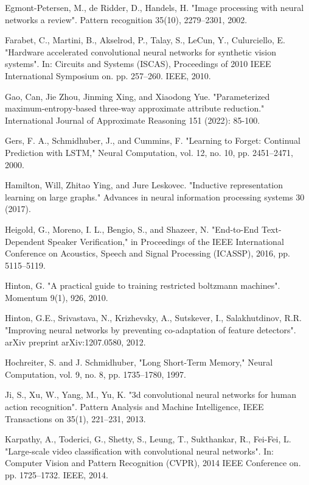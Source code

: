 \documentclass{article}
\begin{document}
\begin{thebibliography}{99}
 Egmont-Petersen, M., de Ridder, D., Handels, H. "Image processing with neural networks a review". Pattern recognition 35(10), 2279–2301, 2002.

 Farabet, C., Martini, B., Akselrod, P., Talay, S., LeCun, Y., Culurciello, E. "Hardware accelerated convolutional neural networks for synthetic vision systems". In: Circuits and Systems (ISCAS), Proceedings of 2010 IEEE International Symposium on. pp. 257–260. IEEE, 2010.

 Gao, Can, Jie Zhou, Jinming Xing, and Xiaodong Yue. "Parameterized maximum-entropy-based three-way approximate attribute reduction." International Journal of Approximate Reasoning 151 (2022): 85-100.

 Gers, F. A., Schmidhuber, J., and Cummins, F. "Learning to Forget: Continual Prediction with LSTM," Neural Computation, vol. 12, no. 10, pp. 2451–2471, 2000.

 Hamilton, Will, Zhitao Ying, and Jure Leskovec. "Inductive representation learning on large graphs." Advances in neural information processing systems 30 (2017).

 Heigold, G., Moreno, I. L., Bengio, S., and Shazeer, N. "End-to-End Text-Dependent Speaker Verification," in Proceedings of the IEEE International Conference on Acoustics, Speech and Signal Processing (ICASSP), 2016, pp. 5115–5119.

 Hinton, G. "A practical guide to training restricted boltzmann machines". Momentum 9(1), 926, 2010.

 Hinton, G.E., Srivastava, N., Krizhevsky, A., Sutskever, I., Salakhutdinov, R.R. "Improving neural networks by preventing co-adaptation of feature detectors". arXiv preprint arXiv:1207.0580, 2012.

 Hochreiter, S. and J. Schmidhuber, "Long Short-Term Memory," Neural Computation, vol. 9, no. 8, pp. 1735–1780, 1997.

 Ji, S., Xu, W., Yang, M., Yu, K. "3d convolutional neural networks for human action recognition". Pattern Analysis and Machine Intelligence, IEEE Transactions on 35(1), 221–231, 2013.

 Karpathy, A., Toderici, G., Shetty, S., Leung, T., Sukthankar, R., Fei-Fei, L. "Large-scale video classification with convolutional neural networks". In: Computer Vision and Pattern Recognition (CVPR), 2014 IEEE Conference on. pp. 1725–1732. IEEE, 2014.


\end{thebibliography}
\end{document}
